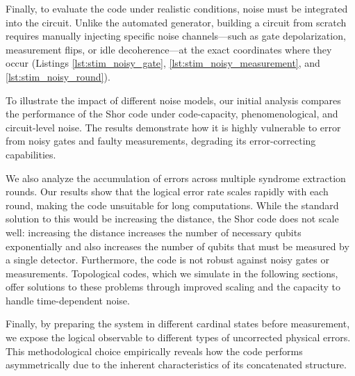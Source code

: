 Finally, to evaluate the code under realistic conditions, noise must be integrated into the circuit. Unlike the automated generator, building a circuit from scratch requires manually injecting specific noise channels---such as gate depolarization, measurement flips, or idle decoherence---at the exact coordinates where they occur (Listings \ref{lst:stim_noisy_gate}, \ref{lst:stim_noisy_measurement}, and \ref{lst:stim_noisy_round}).

To illustrate the impact of different noise models, our initial analysis compares the performance of the Shor code under code-capacity, phenomenological, and circuit-level noise. The results demonstrate how it is highly vulnerable to error from noisy gates and faulty measurements, degrading its error-correcting capabilities.

We also analyze the accumulation of errors across multiple syndrome extraction rounds. Our results show that the logical error rate scales rapidly with each round, making the code unsuitable for long computations. While the standard solution to this would be increasing the distance, the Shor code does not scale well: increasing the distance increases the number of necessary qubits exponentially and also increases the number of qubits that must be measured by a single detector. Furthermore, the code is not robust against noisy gates or measurements. Topological codes, which we simulate in the following sections, offer solutions to these problems through improved scaling and the capacity to handle time-dependent noise.


Finally, by preparing the system in different cardinal states before measurement, we expose the logical observable to different types of uncorrected physical errors. This methodological choice empirically reveals how the code performs asymmetrically due to the inherent characteristics of its concatenated structure.



